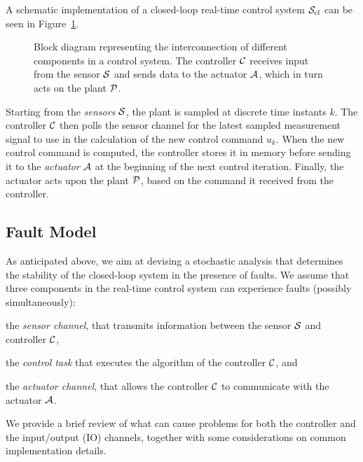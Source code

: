 A schematic implementation of a closed-loop real-time control system $\mathcal{S}_{\text{cl}}$ can be seen in Figure~\ref{fig:scheme}.
\begin{figure}[t]
    \centering
     
    \caption{Block diagram representing the interconnection of different components in a control system. The controller $\mathcal{C}$ receives input from the sensor $\mathcal{S}$ and sends data to the actuator $\mathcal{A}$, which in turn acts on the plant $\mathcal{P}$.}
    \label{fig:scheme}
\end{figure}
Starting from the \emph{sensors} $\mathcal{S}$, the plant is sampled at discrete time instants $k$.
The controller $\mathcal{C}$ then polls the sensor channel for the latest sampled measurement signal to use in the calculation of the new control command $u_k$.
When the new control command is computed, the controller stores it in memory before sending it to the \emph{actuator} $\mathcal{A}$ at the beginning of the next control iteration.
Finally, the actuator acts upon the plant $\mathcal{P}$, based on the command it received from the controller.

\subsection{Fault Model}%
\label{sec:impl}%

As anticipated above, we aim at devising a stochastic analysis that determines the stability of the closed-loop system in the presence of faults.
We assume that three components in the real-time control system can experience faults (possibly simultaneously):
%
\begin{enumerate*}[label=(\roman*)]
    \item the \emph{sensor channel}, that transmits information between the sensor $\mathcal{S}$ and controller $\mathcal{C}$,
    \item the \emph{control task} that executes the algorithm of the controller $\mathcal{C}$, and 
    \item the \emph{actuator channel}, that allows the controller $\mathcal{C}$ to communicate with the actuator $\mathcal{A}$.
\end{enumerate*}
%
We provide a brief review of what can cause problems for both the controller and the input/output (IO) channels, together with some considerations on common implementation details.

